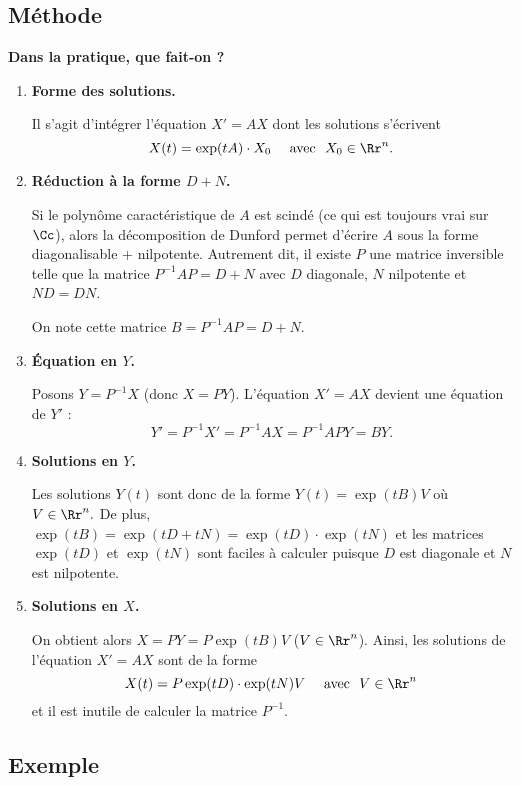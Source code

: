 \documentclass[12pt, class=report,crop=false]{standalone}
\begin{document}
\subsection{Méthode}


\textbf{Dans la pratique, que fait-on ?}

\begin{enumerate}
  \item \textbf{Forme des solutions.} 
  
  Il s'agit d'intégrer l'équation $X'=AX$ dont les solutions 
  s'écrivent 
  $$X(t)=\exp(tA) \cdot X_0 \quad \text{ avec } \  X_0\in\Rr^n.$$
  
  \item \textbf{Réduction à la forme $D + N$.} 
  
  Si le polynôme caractéristique de $A$ est scindé (ce qui est toujours vrai sur $\Cc$), alors la décomposition de Dunford permet d'écrire $A$ sous la forme  \og{}diagonalisable + nilpotente\fg{}. Autrement dit, il existe $P$ une matrice inversible telle que la matrice $P^{-1}AP=D+N$ avec $D$ diagonale, $N$ nilpotente et $ND=DN$.
  
  On note cette matrice $B = P^{-1}AP=D+N$.
  
  
  \item \textbf{\'Equation en $Y$.} 
  
  Posons $Y = P^{-1}X$ (donc $X=PY$). 
  L'équation $X'=AX$ devient une équation de $Y'$ :
  $$Y' = P^{-1}X'= P^{-1}AX = P^{-1}AP Y = BY.$$
  
  \item \textbf{Solutions en $Y$.}  
  
  Les solutions $Y(t)$ sont donc de la forme $Y(t)=\exp(tB)V$ où $V\in\Rr^n.$
  De plus, $\exp(tB)=\exp(tD+tN)=\exp(tD)\cdot\exp(tN)$ et les matrices $\exp(tD)$ et $\exp(tN)$ sont faciles à calculer puisque $D$ est diagonale et $N$ est nilpotente.
  
  \item \textbf{Solutions en $X$.}
  
  On obtient alors $X = PY=P\exp(tB)V$ ($V\in\Rr^n$).
  Ainsi, les solutions de l'équation $X'=AX$ sont de la forme
$$X(t)=P\exp(tD)\cdot\exp(tN)V \quad \text{ avec }\  V\in\Rr^n$$
et il est inutile de calculer la matrice $P^{-1}$.
   
\end{enumerate}

\subsection{Exemple}
\end{document}
